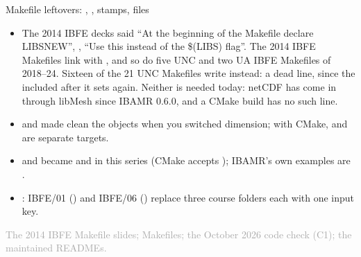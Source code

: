 \documentclass[aspectratio=169,11pt]{beamer}
\newcommand{\sourcecredit}[1]{\vfill\begin{flushright}\tiny\textcolor{DarkGray}{#1}\end{flushright}}
\begin{document}
\begin{frame}{Makefile leftovers: , , stamps,  files}
\label{fr:leftovers}
\small
\begin{itemize}\setlength{\itemsep}{3pt}
  \item {} The 2014 IBFE decks said ``At the beginning of the Makefile declare LIBSNEW'', , ``Use this instead of the \$(LIBS) flag''. The 2014 IBFE Makefiles link with , and so do five UNC and two UA IBFE Makefiles of 2018--24. Sixteen of the 21 UNC Makefiles write  instead: a dead line, since the  included after it sets  again. Neither is needed today: netCDF has come in through libMesh since IBAMR 0.6.0, and a CMake build has no such line.
  \item {}  and  made  clean the objects when you switched dimension; with CMake,  and  are separate targets.
  \item {}  and  became  and  in this series (CMake accepts ); IBAMR's own examples are .
  \item {}: IBFE/01 () and IBFE/06 () replace three course folders each with one input key.
\end{itemize}
\sourcecredit{The 2014 IBFE Makefile slides; \code{examples/legacy} Makefiles; the October 2026 code check (C1); the maintained READMEs.}
\end{frame}
\end{document}
